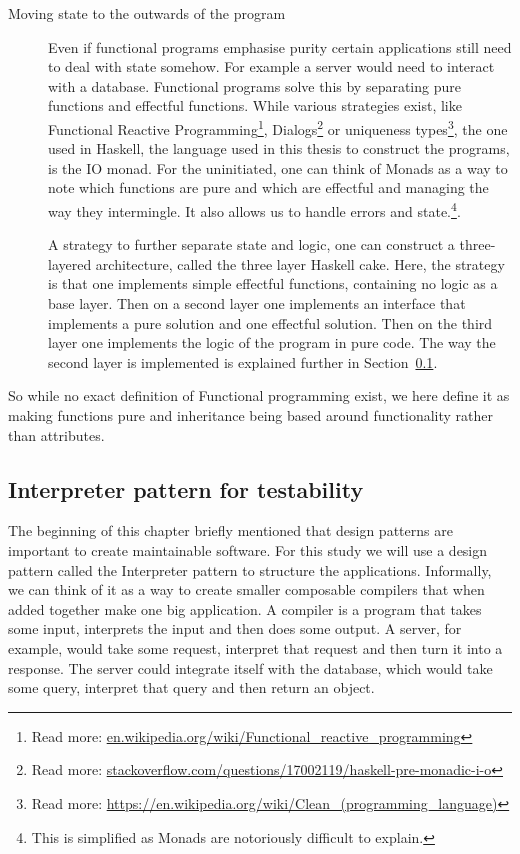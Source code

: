 \begin{description}
\item[Moving state to the outwards of the program]

Even if functional programs emphasise purity certain applications still need to
        deal with state somehow. For example a server would need to interact
        with a database. Functional programs solve this by separating pure
        functions and effectful functions. While various strategies exist, like
        Functional Reactive Programming\footnote{Read more:
        \url{en.wikipedia.org/wiki/Functional_reactive_programming}},
        Dialogs\footnote{Read more:
        \url{stackoverflow.com/questions/17002119/haskell-pre-monadic-i-o}} or
        uniqueness types\footnote{Read more:
        \url{https://en.wikipedia.org/wiki/Clean_(programming_language)}}, the
        one used in Haskell, the language used in this thesis to construct the
        programs, is the IO monad. For the uninitiated, one can think of Monads
        as a way to note which functions are pure and which are effectful and
        managing the way they intermingle. It also allows us to handle errors
        and state.\footnote{This is simplified as Monads are notoriously
        difficult to explain.}. 

A strategy to further separate state and logic, one can construct a
        three-layered architecture, called the three layer Haskell cake. Here,
        the strategy is that one implements simple effectful functions,
        containing no logic as a base layer. Then on a second layer one
        implements an interface that implements a pure solution and one
        effectful solution. Then on the third layer one implements the logic of
        the program in pure code. The way the second layer is implemented is
        explained further in Section~\ref{interpreterpattern}. 
\end{description}

So while no exact definition of Functional programming exist, we here define it
as making functions pure and inheritance being based around functionality rather
than attributes.

\subsection{Interpreter pattern for testability}\label{interpreterpattern}

The beginning of this chapter briefly mentioned that design patterns are
important to create maintainable software.  For this study we will use a design
pattern called the Interpreter pattern to structure the applications.
Informally, we can think of it as a way to create smaller composable compilers
that when added together make one big application. A compiler is a program that
takes some input, interprets the input and then does some output. A server, for
example, would take some request, interpret that request and then turn it into
a response. The server could integrate itself with the database, which would
take some query, interpret that query and then return an
object.~\cite{interpreterpattern}

